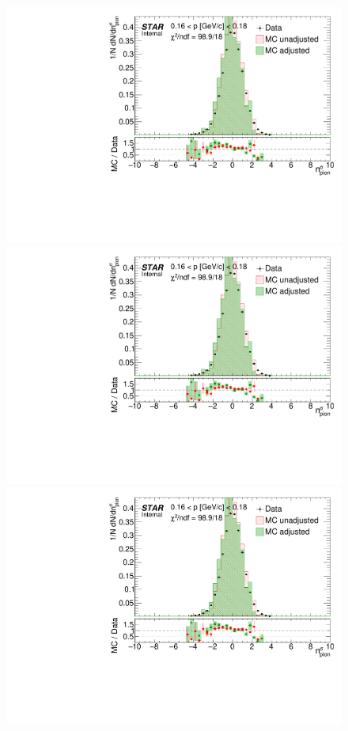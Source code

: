 \begin{figure}[t!]
{}~
\parbox{0.495\textwidth}{
  \centering
  \includegraphics[width=\linewidth,page=35]{graphics/dedx/nSigmaPion_DataVsMC.pdf}\\[3pt]
  \includegraphics[width=\linewidth,page=37]{graphics/dedx/nSigmaPion_DataVsMC.pdf}\\[3pt]
  \includegraphics[width=\linewidth,page=39]{graphics/dedx/nSigmaPion_DataVsMC.pdf}\\[3pt]
}
\end{figure}
